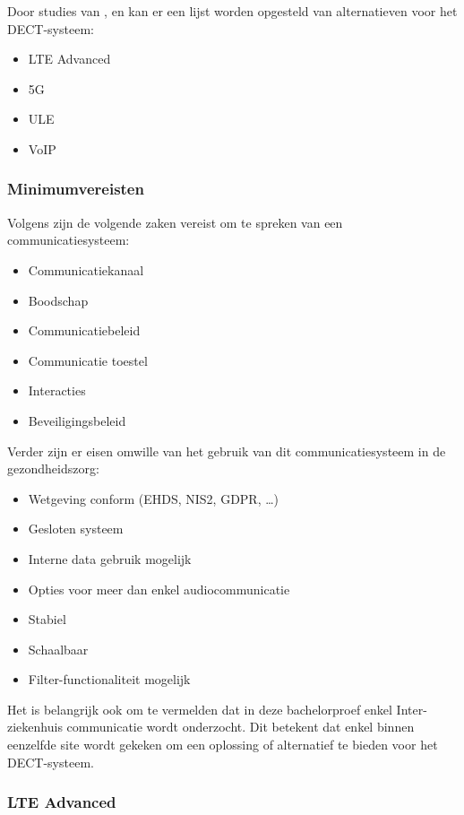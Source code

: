 Door studies van \textcite{Montalvo2024}, \textcite{Kranz2010} en \textcite{Soenmez2018} kan er een lijst worden opgesteld van alternatieven voor het DECT-systeem:

\begin{itemize}
  \item LTE Advanced
  \item 5G
  \item ULE
  \item VoIP

\end{itemize}

\subsubsection{Minimumvereisten}

Volgens \textcite{Coiera2006} zijn de volgende zaken vereist om te spreken van een communicatiesysteem:
\begin{itemize}
  \item Communicatiekanaal
  \item Boodschap
  \item Communicatiebeleid
  \item Communicatie toestel
  \item Interacties
  \item Beveiligingsbeleid
\end{itemize}

Verder zijn er eisen omwille van het gebruik van dit communicatiesysteem in de gezondheidszorg:

\begin{itemize}
  \item Wetgeving conform (EHDS, NIS2, GDPR, \dots)
  \item Gesloten systeem
  \item Interne data gebruik mogelijk
  \item Opties voor meer dan enkel audiocommunicatie
  \item Stabiel
  \item Schaalbaar
  \item Filter-functionaliteit mogelijk
\end{itemize}

Het is belangrijk ook om te vermelden dat in deze bachelorproef enkel Inter-ziekenhuis communicatie wordt onderzocht. Dit betekent dat enkel binnen eenzelfde site wordt gekeken om een oplossing of alternatief te bieden voor het DECT-systeem.

\subsubsection{LTE Advanced}

